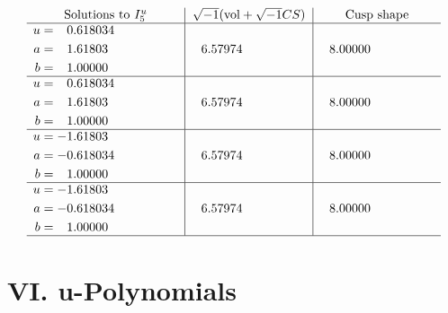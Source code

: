 \documentclass[1p]{elsarticle_modified}
\theoremstyle{definition}
\newcommand{\I}{\sqrt{-1}}
\begin{document}
$$\begin{array}{c|c|c}  
\text{Solutions to }I^u_{5}& \I (\text{vol} + \sqrt{-1}CS) & \text{Cusp shape}\\
 \hline 
\begin{aligned}
u &= \phantom{-}0.618034\phantom{ +0.000000I} \\
a &= \phantom{-}1.61803\phantom{ +0.000000I} \\
b &= \phantom{-}1.00000\phantom{ +0.000000I}\end{aligned}
 & \phantom{-}6.57974\phantom{ +0.000000I} & \phantom{-}8.00000\phantom{ +0.000000I} \\ \hline\begin{aligned}
u &= \phantom{-}0.618034\phantom{ +0.000000I} \\
a &= \phantom{-}1.61803\phantom{ +0.000000I} \\
b &= \phantom{-}1.00000\phantom{ +0.000000I}\end{aligned}
 & \phantom{-}6.57974\phantom{ +0.000000I} & \phantom{-}8.00000\phantom{ +0.000000I} \\ \hline\begin{aligned}
u &= -1.61803\phantom{ +0.000000I} \\
a &= -0.618034\phantom{ +0.000000I} \\
b &= \phantom{-}1.00000\phantom{ +0.000000I}\end{aligned}
 & \phantom{-}6.57974\phantom{ +0.000000I} & \phantom{-}8.00000\phantom{ +0.000000I} \\ \hline\begin{aligned}
u &= -1.61803\phantom{ +0.000000I} \\
a &= -0.618034\phantom{ +0.000000I} \\
b &= \phantom{-}1.00000\phantom{ +0.000000I}\end{aligned}
 & \phantom{-}6.57974\phantom{ +0.000000I} & \phantom{-}8.00000\phantom{ +0.000000I}\\
 \hline 
 \end{array}$$\newpage
\newpage\renewcommand{\arraystretch}{1}
\centering \section*{ VI. u-Polynomials}
\end{document}
